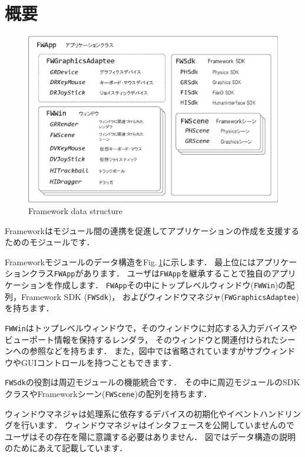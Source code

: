 \section{\KLUDGE 概要}


\begin{figure}[t]
\begin{center}
\includegraphics[width=.7\hsize]{fig/framework.eps}
\end{center}
\caption{Framework data structure}
\label{fig_framework}
\end{figure}


Framework\KLUDGE はモジュール間の連携を促進してアプリケーションの作成を支援するためのモジュールです．

Framework\KLUDGE モジュールのデータ構造をFig.\,\ref{fig_framework}\KLUDGE に示します．
\KLUDGE 最上位にはアプリケーションクラス\texttt{FWApp}\KLUDGE があります．
\KLUDGE ユーザは\texttt{FWApp}\KLUDGE を継承することで独自のアプリケーションを作成します．
\texttt{FWApp}\KLUDGE その中にトップレベルウィンドウ(\texttt{FWWin})\KLUDGE の配列，Framework SDK (\texttt{FWSdk})\KLUDGE ，
\KLUDGE およびウィンドウマネジャ(\texttt{FWGraphicsAdaptee})\KLUDGE を持ちます．

\texttt{FWWin}\KLUDGE はトップレベルウィンドウで，そのウィンドウに対応する入力デバイスやビューポート情報を保持するレンダラ，
\KLUDGE そのウィンドウと関連付けられたシーンへの参照などを持ちます．
\KLUDGE また，図中では省略されていますがサブウィンドウやGUI\KLUDGE コントロールを持つこともできます．

\texttt{FWSdk}\KLUDGE の役割は周辺モジュールの機能統合です．
\KLUDGE その中に周辺モジュールのSDK\KLUDGE クラスやFramework\KLUDGE シーン(\texttt{FWScene})\KLUDGE の配列を持ちます．

\KLUDGE ウィンドウマネジャは処理系に依存するデバイスの初期化やイベントハンドリングを行います．
\KLUDGE ウィンドウマネジャはインタフェースを公開していませんのでユーザはその存在を陽に意識する必要はありません．
\KLUDGE 図ではデータ構造の説明のためにあえて記載しています．

